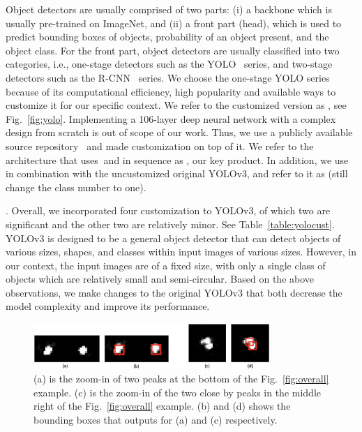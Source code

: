 Object detectors are usually comprised of two parts: (i) a backbone which is usually pre-trained on ImageNet, and (ii) a front part (head), which is used to predict bounding boxes of objects, probability of an object present, and the  object class. 
For the front part, object detectors are usually classified into two categories, i.e., one-stage detectors such as the YOLO~\cite{cvpr16-yolo} series, and two-stage detectors such as the R-CNN~\cite{cvpr14-rcnn} series.
We choose the one-stage YOLO series because of its computational efficiency, high popularity and available ways to customize it for our specific context. We refer to the customized version as \yolocust, see Fig.~\ref{fig:yolo}.
Implementing a 106-layer deep neural network with a complex design from scratch is
out of scope of our work. 
Thus, we use a publicly available source repository~\cite{yolo-github} and made customization on top of it.
We refer to the architecture that uses \imgimg $\ $and \yolocust in sequence as \our, our key product.  
In addition, we use \imgimg in combination with the uncustomized original YOLOv3,
and refer to it as \ouryolo (still change the class number to one).

.
Overall, we incorporated four customization to YOLOv3, of which two are significant and the
other two are relatively minor. See Table~\ref{table:yolocust}. YOLOv3 is designed to be a general object detector that can detect objects of various sizes, shapes, and classes within input images
of various sizes. However, in our context, the input images are of a fixed size, with
only a single class of objects which are relatively small and semi-circular. 
Based on the above observations, we make changes to the original YOLOv3 that both 
decrease the model complexity and improve its performance.

\begin{figure}[t]
	\centering
	\includegraphics[width=0.8\textwidth]{chapters/wowmom-pmc/figures/peaks.png}
	\caption{(a) is the zoom-in of two peaks at the bottom of the Fig.~\ref{fig:overall} example.
	(c) is the zoom-in of the two close by peaks in the middle right of the Fig.~\ref{fig:overall} example. (b) and (d) shows the bounding boxes that \yolocust outputs for (a) and (c) respectively.}
	\label{fig:peaks}
\end{figure}

